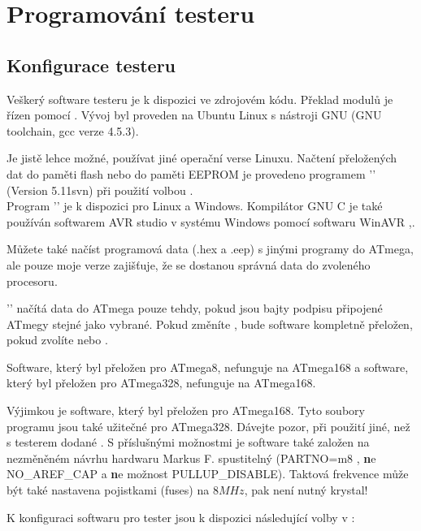 \chapter{Programování testeru}

\label{sec:config}
\section{Konfigurace testeru}
Veškerý software testeru je k dispozici ve zdrojovém kódu.
Překlad modulů je řízen pomocí . Vývoj byl proveden
na Ubuntu Linux s nástroji GNU (GNU toolchain, gcc verze 4.5.3).

Je jistě lehce možné, používat jiné operační verse Linuxu.
Načtení přeložených dat do paměti flash nebo do paměti EEPROM
je provedeno programem '' \cite{avrdude} (Version 5.11svn) při použití  volbou .\\
 Program '' je k dispozici pro Linux a Windows.
Kompilátor GNU C je také používán softwarem AVR studio v systému Windows pomocí softwaru WinAVR \cite{winavr1},\cite{winavr2}.

Můžete také načíst programová data (.hex a .eep) s jinými programy do ATmega,
ale pouze moje   verze zajišťuje, že se dostanou správná data do zvoleného procesoru.

'' načítá data do ATmega pouze tehdy, pokud jsou bajty podpisu připojené ATmegy stejné jako vybrané.
Pokud změníte , bude software kompletně přeložen, pokud zvolíte  nebo
.

Software, který byl přeložen pro ATmega8, nefunguje na ATmega168 a
software, který byl přeložen pro ATmega328, nefunguje na ATmega168.

Výjimkou je software, který byl přeložen pro ATmega168. Tyto soubory programu
jsou také užitečné pro ATmega328.
Dávejte pozor, při použití jiné, než s testerem dodané .
S příslušnými možnostmi je software také založen na nezměněném návrhu hardwaru
Markus F. spustitelný (PARTNO=m8 , {\textbf ne} NO\_AREF\_CAP a {\textbf ne} možnost PULLUP\_DISABLE).
Taktová frekvence může být také nastavena pojistkami (fuses) na \(8MHz\), pak není nutný krystal!

K konfiguraci softwaru pro tester jsou k dispozici následující volby v :

